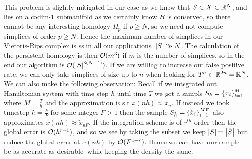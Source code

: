 \documentclass{article}
\begin{document}
This problem is slightly mitigated in our case as we know that $S \subset X \subset \mathbb{R}^N$, and lies on a codim-1 submanifold as we certainly know $\tilde{H}$ is conserved, so there cannot be any interesting homology $H_p$ if $p \geq N$, so we need not compute simplices of order $p \geq N$. Hence the maximum number of simplices in our Vietoris-Rips complex is 
ss in all our applications, $\left\lvert S \right\rvert \gg N$. The calculation of the persistent homology is then $\mathcal{O}(m^3)$ if $m$ is the number of simplices, so in the end our algorithm is $\mathcal{O}(\left\lvert S \right\rvert^{3(N-1)})$. If we are willing to increase our false positive rate, we can only take simplices of size up to $n$ when looking for $T^n \subset \mathbb{R}^{2n}=\mathbb{R}^N$.\\
We can also make the following observation: Recall if we integrated out Hamiltonian system with time step $h$ until time $T$ we got a sample $S_h = \left\{ x_i \right\}_{i=1}^M$ where $M = \frac{T}{h}$ and the approximation is s.t $x(nh) \approx x_n$. If instead we took timestep $\tilde{h} = \frac{h}{F}$ for some integer $F>1$ then the sample $S_{\tilde{h}} = \left\{ \tilde{x}_i \right\}_{i=1}^{MF}$ also approximates $x(nh) \approx \tilde{x}_{nF}$. If the integration scheme is of $r^{th}$-order then the global error is $\mathcal{O}(h^{r-1})$, and so we see by taking the subset 
we keep $\left\lvert S \right\rvert= \left\lvert \tilde{S} \right\rvert$ but reduce the global error at $x(nh)$ by $\mathcal{O}(F^{1-r})$. Hence we can have our sample be as accurate as desirable, while keeping the density the same. 


\end{document}
